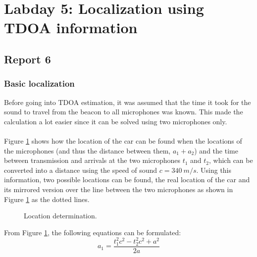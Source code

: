 \documentclass[final]{scrreprt} %
\begin{document}
\section{Labday 5: Localization using TDOA information}
\subsection{Report 6}
\subsubsection{Basic localization}
Before going into TDOA estimation, it was assumed that the time it took for the sound to travel from the beacon to all microphones was known.
This made the calculation a lot easier since it can be solved using two microphones only.
\\ \\
Figure \ref{fig:location} shows how the location of the car can be found when the locations of the microphones (and thus the distance between them, $a_1 + a_2$) and the time between transmission and arrivals at the two microphones $t_1$ and $t_2$, which can be converted into a distance using the speed of sound $c = 340~m/s$.
Using this information, two possible locations can be found, the real location of the car and its mirrored version over the line between the two microphones as shown in Figure \ref{fig:location} as the dotted lines.

\begin{figure} [H]
\centering
	\caption{Location determination.}
	\label{fig:location}
\end{figure}

From Figure \ref{fig:location}, the following equations can be formulated:
\begin{equation}
	a_1 = \frac{t_1^2 c^2 - t_2^2 c^2 + a^2}{2 a}
\label{eq:a1}
\end{equation}
\end{document}
